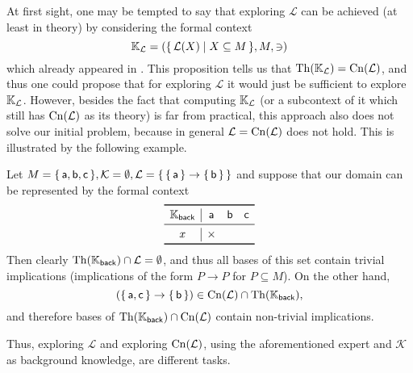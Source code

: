 At first sight, one may be tempted to say that exploring $\mathcal{L}$ can be achieved (at
least in theory) by considering the formal context
\begin{equation*}
  {\ensuremath{\mathbb{K}}}_{\mathcal{L}} = ({\{\, \mathcal{L}(X) \mid X \subseteq M \,\}}, M, \ni)
\end{equation*}
which already appeared in .  This proposition
tells us that $\operatorname{Th}({\mathbb{K}}_{\mathcal{L}}) = \operatorname{Cn}(\mathcal{L})$, and thus one could propose
that for exploring $\mathcal{L}$ it would just be sufficient to explore ${\mathbb{K}}_{\mathcal{L}}$.  However, besides the fact that computing ${\mathbb{K}}_{\mathcal{L}}$ (or a
subcontext of it which still has $\operatorname{Cn}(\mathcal{L})$ as its theory) is far from practical,
this approach also does not solve our initial problem, because in general $\mathcal{L} =
\operatorname{Cn}(\mathcal{L})$ does not hold.  This is illustrated by the following example.

\begin{Example}
  \label{expl:why-exploring-implications-is-different}
  Let $M = {\{\, \mathsf{a}, \mathsf{b}, \mathsf{c} \,\}}, \mathcal{K} = \emptyset,
  \mathcal{L} = {\{\, {\{\, \mathsf{a} \,\}} \to {\ensuremath{\{\, \mathsf{b} \,\}}} \,\}}$ and suppose that our
  domain can be represented by the formal context
  \begin{equation*}
    \begin{array}{c|ccc}
      \toprule
      \con K_{\mathsf{back}} & \mathsf{a} & \mathsf{b} & \mathsf{c} \\
      \midrule
      x & \times \\
      \bottomrule
    \end{array}
  \end{equation*}
  Then clearly $\operatorname{Th}({\mathbb{K}}_{\mathsf{back}}) \cap \mathcal{L} = \emptyset$, and thus all
  bases of this set contain trivial implications (\ie implications of the form $P \to P$
  for $P \subseteq M$).  On the other hand,
  \begin{equation*}
    ({\{\, \mathsf{a}, \mathsf{c} \,\}} \to {\ensuremath{\{\, \mathsf{b} \,\}}}) \in
    \operatorname{Cn}(\mathcal{L}) \cap \operatorname{Th}({\mathbb{K}}_{\mathsf{back}}),
  \end{equation*}
  and therefore bases of $\operatorname{Th}({\mathbb{K}}_{\mathsf{back}}) \cap \operatorname{Cn}(\mathcal{L})$ contain
  non-trivial implications.

  Thus, exploring $\mathcal{L}$ and exploring $\operatorname{Cn}(\mathcal{L})$, using the aforementioned
  expert and $\mathcal{K}$ as background knowledge, are different tasks.
\end{Example}

